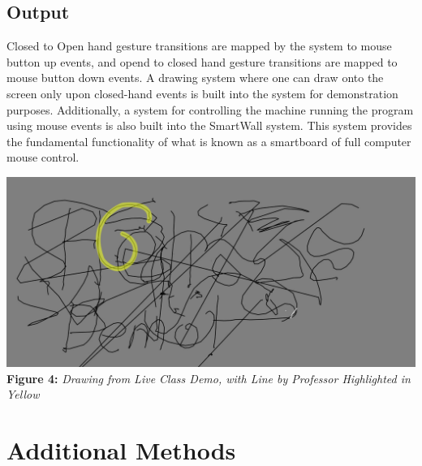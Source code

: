 \documentclass[twoside,twocolumn]{article}
\begin{document}
\subsection{Output}
Closed to Open hand gesture transitions are mapped by the system to mouse button up events, and opend to closed hand gesture transitions are mapped to mouse button down events. A drawing system where one can draw onto the screen only upon closed-hand events is built into the system for demonstration purposes. Additionally, a system for controlling the machine running the program using mouse events is also built into the SmartWall system. This system provides the fundamental functionality of what is known as a smartboard of full computer mouse control.

\begin{center}
	\includegraphics[scale=0.13]{demo_highlight} \\
	\vspace{0.25cm}
	\small{\textbf{Figure 4:} \textit{Drawing from Live Class Demo, with Line by Professor Highlighted in Yellow}}
\end{center}


\section{Additional Methods}
\end{document}
